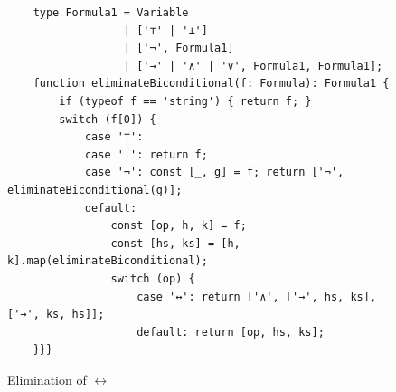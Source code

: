 \begin{figure}[!ht]
  \centering
\begin{verbatim}
    type Formula1 = Variable 
                  | ['⊤' | '⊥']
                  | ['¬', Formula1]
                  | ['→' | '∧' | '∨', Formula1, Formula1];
    function eliminateBiconditional(f: Formula): Formula1 {
        if (typeof f == 'string') { return f; }
        switch (f[0]) {
            case '⊤':
            case '⊥': return f;        
            case '¬': const [_, g] = f; return ['¬', eliminateBiconditional(g)];
            default: 
                const [op, h, k] = f;
                const [hs, ks] = [h, k].map(eliminateBiconditional);
                switch (op) {   
                    case '↔': return ['∧', ['→', hs, ks], ['→', ks, hs]]; 
                    default: return [op, hs, ks]; 
    }}}
\end{verbatim}
\vspace*{-0.3cm}
  \caption{Elimination of $\leftrightarrow$}
  \label{fig:elimBiconditional}
\end{figure} 


